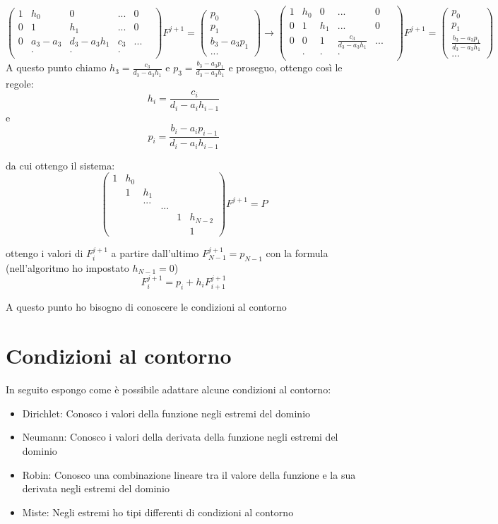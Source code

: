 \documentclass[]{article}
\newcommand{\lr}[3]{\ensuremath{\left#1 #3 \right#2}}
\newcommand{\lrt}[1]{\lr{(}{)}{#1}}
\numberwithin{equation}{subsection}
\begin{document}
$$
\lrt{\begin{array}{cccccc}
1&h_0&0&...&0\\
0 &1&h_1&...&0\\
0&a_3-a_3&d_3-a_3 h_1&c_3&...\\
&.&.&.&&\\
\end{array}} F^{j+1} = \lrt{\begin{array}{c}
p_0\\p_1\\b_3 -a_3 p_1\\...
\end{array}} \to
\lrt{\begin{array}{cccccc}
1&h_0&0&...&0\\
0 &1&h_1&...&0\\
0&0&1&\frac{c_3}{d_3-a_3 h_1}&...\\
&.&.&.&&\\
\end{array}} F^{j+1} = \lrt{\begin{array}{c}
p_0\\p_1\\\frac{b_3 -a_3 p_1}{d_3-a_3 h_1}\\...
\end{array}}
$$
A questo punto chiamo $h_3 = \frac{c_3}{d_3 -a_3 h_1}$ e $p_3=\frac{b_3-a_3p_1}{d_3 -a_3 h_1}$ e proseguo, ottengo cos\`i le regole:
$$h_i = \frac{c_i}{d_i -a_i h_{i-1}}$$ e $$p_i=\frac{b_i-a_ip_{i-1}}{d_i -a_i h_{i-1}}$$

da cui ottengo il sistema:
$$\lrt{\begin{array}{cccccc}
1&h_0&&&\\
&1&h_1&\\
&&...&&&\\
&&&...&&\\
&&&&1&h_{N-2}\\
&&&&&1
\end{array}}F^{j+1} = P$$

ottengo i valori di $F_i^{j+1}$ a partire dall'ultimo $F_{N-1}^{j+1} = p_{N-1}$ con la formula (nell'algoritmo ho impostato $h_{N-1}=0$)
$$F_{i}^{j+1} = p_{i}+h_i F_{i+1}^{j+1}$$ 

A questo punto ho bisogno di conoscere le condizioni al contorno
\section{Condizioni al contorno}
In seguito espongo come \`e possibile adattare alcune condizioni al contorno:
\begin{itemize}
\item Dirichlet: Conosco i valori della funzione negli estremi del dominio
\item Neumann: Conosco i valori della derivata della funzione negli estremi del dominio
\item Robin: Conosco una combinazione lineare tra il valore della funzione e la sua derivata negli estremi del dominio
\item Miste: Negli estremi ho tipi differenti di condizioni al contorno
\end{itemize}
\end{document}
